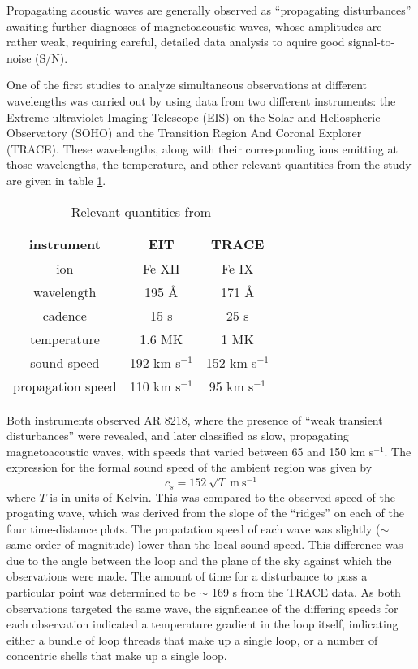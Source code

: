 \documentclass[preprint2]{aastex}
\begin{document}
Propagating acoustic waves are generally observed as ``propagating
disturbances'' awaiting further diagnoses of magnetoacoustic waves,
whose amplitudes are rather weak, requiring careful, detailed data
analysis to aquire good signal-to-noise (S/N).

One of the first studies to analyze
simultaneous observations at different wavelengths was carried out by
\cite{pac_1} using data from two different instruments:
the Extreme ultraviolet Imaging Telescope (EIS)
on the Solar and Heliospheric Observatory (SOHO) and the
Transition Region And Coronal Explorer (TRACE).
These wavelengths, along with their corresponding ions emitting at those
wavelengths, the temperature, and other relevant quantities from the
study are given in table \ref{stuff}.
\begin{table}[h]
\centering
\begin{tabular}{c c c}
\hline\hline
instrument & EIT & TRACE\\
\hline
ion & Fe {\footnotesize XII} & Fe {\footnotesize IX}\\
wavelength & 195 \AA{} & 171 \AA{}\\
cadence & 15 s & 25 s\\
temperature & 1.6 MK & 1 MK\\
sound speed & 192 km s$^{-1}$ & 152 km s$^{-1}$\\
propagation speed & 110 km s$^{-1}$ & 95 km s$^{-1}$\\
\hline\hline
\end{tabular}
\caption{Relevant quantities from \cite{pac_1}}
\label{stuff}
\end{table}
Both instruments observed AR 8218, where the presence of
``weak transient disturbances'' were revealed, and later classified as
slow, propagating magnetoacoustic waves, with speeds that varied
between 65 and 150 km s$^{-1}$.
The expression for the formal sound speed of the ambient region
was given by
\begin{equation}
    c_{s} = 152\ \sqrt{T}\ \textrm{m}\ \textrm{s}^{-1}
\end{equation}
where $T$ is in units of Kelvin.
This was compared to the observed speed of the progating wave, which
was derived from the slope of the ``ridges'' on each of the four
time-distance plots.
The propatation speed of each wave was slightly ($\sim$ same order of
magnitude) lower than the local sound speed. This difference
was due to the angle between the loop and the plane of the sky against
which the observations were made.
The amount of time for a disturbance to pass a particular point was
determined to be $\sim$ 169 s from the TRACE data.
As both observations targeted the same wave, the signficance of the
differing speeds for each observation indicated a temperature gradient
in the loop itself, indicating either a bundle of loop threads that
make up a single loop, or a number of concentric shells that make up a
single loop.
\end{document}
